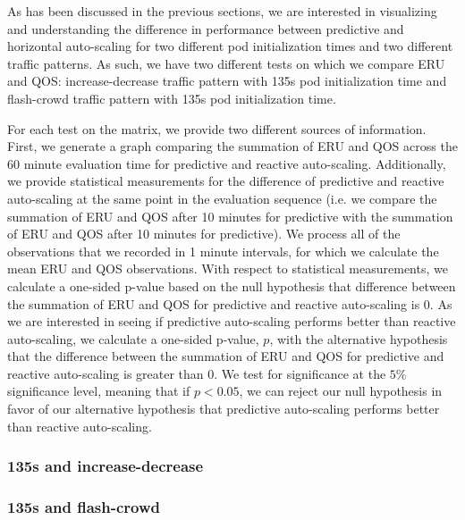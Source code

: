 As has been discussed in the previous sections, we are interested in visualizing
and understanding the difference in performance between predictive and
horizontal auto-scaling for two different pod initialization times and two
different traffic patterns. As such, we have two different tests on which we
compare ERU and QOS: increase-decrease traffic pattern with 135s pod
initialization time and flash-crowd traffic pattern with 135s pod initialization time.

For each test on the matrix, we provide two different sources of information.
First, we generate a graph comparing the summation of ERU and QOS across the 60
minute evaluation time for predictive and reactive auto-scaling. Additionally,
we provide statistical measurements for the difference of predictive and
reactive auto-scaling at the same point in the evaluation sequence (i.e. we
compare the summation of ERU and QOS after 10 minutes for predictive with the
summation of ERU and QOS after 10 minutes for predictive). We process all of the
observations that we recorded in 1 minute intervals, for which we calculate the
mean ERU and QOS observations. With respect to statistical measurements, we
calculate a one-sided p-value based on the null hypothesis that difference
between the summation of ERU and QOS for predictive and reactive auto-scaling is
$0$. As we are interested in seeing if predictive auto-scaling performs better
than reactive auto-scaling, we calculate a one-sided p-value, $p$, with the alternative
hypothesis that the difference between the summation of ERU and QOS for
predictive and reactive auto-scaling is greater than $0$. We test for
significance at the $5\%$ significance level, meaning that if $p < 0.05$, we can
reject our null hypothesis in favor of our alternative hypothesis that
predictive auto-scaling performs better than reactive auto-scaling.

\subsubsection{135s and increase-decrease}



\subsubsection{135s and flash-crowd}


